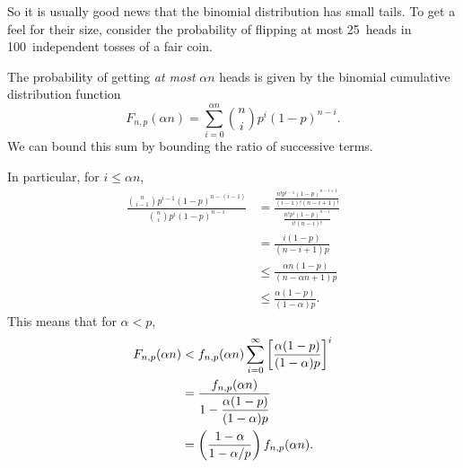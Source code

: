 So it is usually good news that the binomial distribution has small
tails.  To get a feel for their size, consider the probability of
flipping at most 25~heads in 100~independent tosses of a fair coin.

The probability of getting \emph{at most} $\alpha n$ heads is given by
the binomial cumulative distribution function
\begin{equation}\label{LN12:Jsum}
F_{n, p}(\alpha n)
    = \sum_{i = 0}^{\alpha n} \binom{n}{i} p^i (1 - p)^{n - i}.
\end{equation}
We can bound this sum by bounding the ratio of successive terms.

In particular, for $i \le \alpha n$,
\begingroup
{}
\begin{align*}
\frac{ \displaystyle \binom{n}{i - 1} p^{i - 1} (1 - p)^{n - (i - 1)} }
     { \displaystyle \binom{n}{i}     p^i       (1 - p)^{n - i} }
    &=    \frac{\displaystyle
                  \frac{ n! p^{i - 1} (1 - p)^{n - i + 1} }
                       { (i - 1)! (n - i + 1) ! }
              }
              {\displaystyle
                  \frac{ n! p^i (1 - p)^{n - i} }
                       { i! (n - i)! }
              } \\
    &=    \frac{ i (1 - p) }{ (n - i + 1) p } \\
    &\le  \frac{ \alpha n (1 - p) }{ (n - \alpha n + 1) p } \\
    &\le  \frac{ \alpha (1 - p) }{ (1 - \alpha) p }.
\end{align*}
\endgroup
This means that for $\alpha < p$,
\begingroup
{}
\begin{align}
F_{n, p}(\alpha n)
    &<  f_{n, p}(\alpha n)
        \sum_{i = 0}^\infty \left[ \frac{\alpha(1 - p)}{(1 - \alpha)p}\right]^i
\notag \\
    &= \frac{\displaystyle f_{n, p}(\alpha n)}
            {\displaystyle 1 - \frac{\alpha (1 - p)}{(1 - \alpha)p}}
            \notag\\
    &= \left( \frac{1 - \alpha}{1 - \alpha/p} \right) f_{n, p}(\alpha n).
\label{eqn:16F7}
\end{align}
\endgroup

